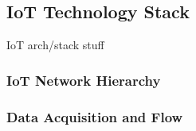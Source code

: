\subsection{IoT Technology Stack}
IoT arch/stack stuff

\subsubsection{IoT Network Hierarchy}
\subsubsection{Data Acquisition and Flow}
